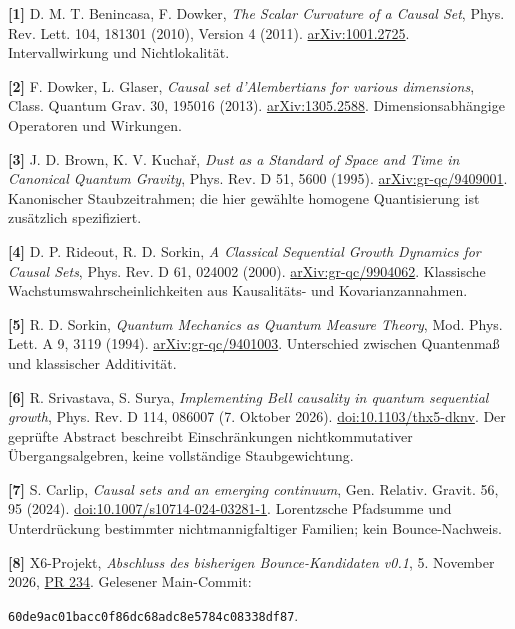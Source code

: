 \documentclass[11pt,a4paper]{article}
\begin{document}
{\small
\textbf{[1]} D. M. T. Benincasa, F. Dowker, \emph{The Scalar Curvature of a Causal Set}, Phys. Rev. Lett. 104, 181301 (2010), Version 4 (2011). \href{https://arxiv.org/abs/1001.2725}{arXiv:1001.2725}. Intervallwirkung und Nichtlokalität.

\textbf{[2]} F. Dowker, L. Glaser, \emph{Causal set d'Alembertians for various dimensions}, Class. Quantum Grav. 30, 195016 (2013). \href{https://arxiv.org/abs/1305.2588}{arXiv:1305.2588}. Dimensionsabhängige Operatoren und Wirkungen.

\textbf{[3]} J. D. Brown, K. V. Kucha\v r, \emph{Dust as a Standard of Space and Time in Canonical Quantum Gravity}, Phys. Rev. D 51, 5600 (1995). \href{https://arxiv.org/abs/gr-qc/9409001}{arXiv:gr-qc/9409001}. Kanonischer Staubzeitrahmen; die hier gewählte homogene Quantisierung ist zusätzlich spezifiziert.

\textbf{[4]} D. P. Rideout, R. D. Sorkin, \emph{A Classical Sequential Growth Dynamics for Causal Sets}, Phys. Rev. D 61, 024002 (2000). \href{https://arxiv.org/abs/gr-qc/9904062}{arXiv:gr-qc/9904062}. Klassische Wachstumswahrscheinlichkeiten aus Kausalitäts- und Kovarianzannahmen.

\textbf{[5]} R. D. Sorkin, \emph{Quantum Mechanics as Quantum Measure Theory}, Mod. Phys. Lett. A 9, 3119 (1994). \href{https://arxiv.org/abs/gr-qc/9401003}{arXiv:gr-qc/9401003}. Unterschied zwischen Quantenmaß und klassischer Additivität.

\textbf{[6]} R. Srivastava, S. Surya, \emph{Implementing Bell causality in quantum sequential growth}, Phys. Rev. D 114, 086007 (7. Oktober 2026). \href{https://doi.org/10.1103/thx5-dknv}{doi:10.1103/thx5-dknv}. Der geprüfte Abstract beschreibt Einschränkungen nichtkommutativer Übergangsalgebren, keine vollständige Staubgewichtung.

\textbf{[7]} S. Carlip, \emph{Causal sets and an emerging continuum}, Gen. Relativ. Gravit. 56, 95 (2024). \href{https://doi.org/10.1007/s10714-024-03281-1}{doi:10.1007/s10714-024-03281-1}. Lorentzsche Pfadsumme und Unterdrückung bestimmter nichtmannigfaltiger Familien; kein Bounce-Nachweis.

\textbf{[8]} X6-Projekt, \emph{Abschluss des bisherigen Bounce-Kandidaten v0.1}, 5. November 2026, \href{https://github.com/thomasmgfeller/x6-spectral-astrolabium/pull/234}{PR 234}. Gelesener Main-Commit:\par
\texttt{60de9ac01bacc0f86dc68adc8e5784c08338df87}.
}
\end{document}
